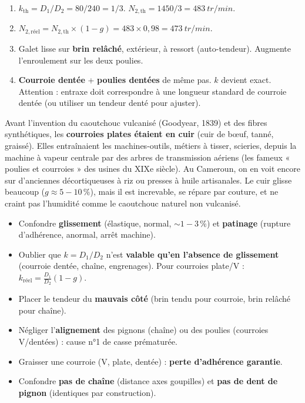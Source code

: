 \documentclass[11pt]{article}
\begin{document}
\begin{corrige}
\begin{enumerate}
    \item $k_{\text{th}} = D_1/D_2 = 80/240 = 1/3$. $N_{2,\text{th}} = 1450/3 = \SI{483}{tr/min}$.
    \item $N_{2,\text{réel}} = N_{2,\text{th}} \times (1 - g) = 483 \times 0,98 = \SI{473}{tr/min}$.
    \item Galet lisse sur \textbf{brin relâché}, extérieur, à ressort (auto-tendeur). Augmente l'enroulement sur les deux poulies.
    \item \textbf{Courroie dentée} + \textbf{poulies dentées} de même pas. $k$ devient exact. Attention : entraxe doit correspondre à une longueur standard de courroie dentée (ou utiliser un tendeur denté pour ajuster).
\end{enumerate}
\end{corrige}

\begin{savaistu}
Avant l'invention du caoutchouc vulcanisé (Goodyear, 1839) et des fibres synthétiques, les \textbf{courroies plates étaient en cuir} (cuir de bœuf, tanné, graissé). Elles entraînaient les machines-outils, métiers à tisser, scieries, depuis la machine à vapeur centrale par des arbres de transmission aériens (les fameux « poulies et courroies » des usines du XIXe siècle). Au Cameroun, on en voit encore sur d'anciennes décortiqueuses à riz ou presses à huile artisanales. Le cuir glisse beaucoup ($g \approx 5-10\,\%$), mais il est increvable, se répare par couture, et ne craint pas l'humidité comme le caoutchouc naturel non vulcanisé.
\end{savaistu}

\begin{attention}
\begin{itemize}
    \item Confondre \textbf{glissement} (élastique, normal, $\sim 1-3\,\%$) et \textbf{patinage} (rupture d'adhérence, anormal, arrêt machine).
    \item Oublier que $k = D_1/D_2$ n'est \textbf{valable qu'en l'absence de glissement} (courroie dentée, chaîne, engrenages). Pour courroies plate/V : $k_{\text{réel}} = \frac{D_1}{D_2}(1-g)$.
    \item Placer le tendeur du \textbf{mauvais côté} (brin tendu pour courroie, brin relâché pour chaîne).
    \item Négliger l'\textbf{alignement} des pignons (chaîne) ou des poulies (courroies V/dentées) : cause n°1 de casse prématurée.
    \item Graisser une courroie (V, plate, dentée) : \textbf{perte d'adhérence garantie}.
    \item Confondre \textbf{pas de chaîne} (distance axes goupilles) et \textbf{pas de dent de pignon} (identiques par construction).
\end{itemize}
\end{attention}
\end{document}

